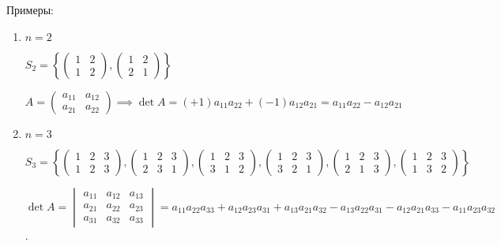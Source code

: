 \bigskip
Примеры:

\begin{enumerate}
\item
    $n = 2$

    $S_2 = \left\{ \begin{pmatrix} 1 & 2 \\ 1 & 2 \end{pmatrix}, \begin{pmatrix} 1 & 2 \\ 2 & 1 \end{pmatrix} \right\}$

    $A = \begin{pmatrix} a_{11} & a_{12} \\ a_{21} & a_{22} \end{pmatrix} \implies \det A = (+1) a_{11} a_{22} + (-1) a_{12} a_{21} = a_{11} a_{22} - a_{12} a_{21}$

\item
    $n = 3$

    $S_3 = \left\{
    \begin{pmatrix} 1 & 2 & 3 \\ 1 & 2 & 3 \end{pmatrix},
    \begin{pmatrix} 1 & 2 & 3 \\ 2 & 3 & 1 \end{pmatrix},
    \begin{pmatrix} 1 & 2 & 3 \\ 3 & 1 & 2 \end{pmatrix},
    \begin{pmatrix} 1 & 2 & 3 \\ 3 & 2 & 1 \end{pmatrix},
    \begin{pmatrix} 1 & 2 & 3 \\ 2 & 1 & 3 \end{pmatrix},
    \begin{pmatrix} 1 & 2 & 3 \\ 1 & 3 & 2 \end{pmatrix} \right\}$

    $\det A = \begin{vmatrix} a_{11} & a_{12} & a_{13} \\ a_{21} & a_{22} & a_{23} \\ a_{31} & a_{32} & a_{33} \end{vmatrix} = a_{11} a_{22} a_{33} + a_{12} a_{23} a_{31} + a_{13} a_{21} a_{32} - a_{13} a_{22} a_{31} - a_{12} a_{21} a_{33} - a_{11} a_{23} a_{32}$.
\end{enumerate}
